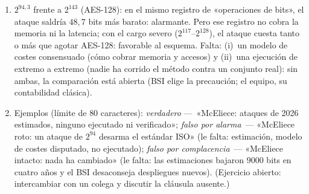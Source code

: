 \begin{enumerate}[leftmargin=1.9em,itemsep=4pt]
        cifra concreta $2^{102{,}4}$ depende de la contabilidad.
        (c)~Heurística y disputada: la afirmación de Vedenev
        «esencialmente una ejecución» no está verificada de forma
        independiente (hay réplicas y contra-réplicas). (d)~Hecho
        (negativo y verificable): nadie ha ejecutado el cómputo de
        núcleos contra un conjunto real; los retos TII tienen
        $n=214$.
  \item $2^{94{,}3}$ frente a $2^{143}$ (AES-128): en el mismo
        registro de «operaciones de bits», el ataque saldría
        $48{,}7$ bits más barato: alarmante. Pero ese registro no
        cobra la memoria ni la latencia; con el cargo severo
        ($2^{117}$--$2^{128}$), el ataque cuesta tanto o más que
        agotar AES-128: favorable al esquema. Falta: (i)~un modelo
        de costes consensuado (cómo cobrar memoria y accesos) y
        (ii)~una ejecución de extremo a extremo (nadie ha corrido
        el método contra un conjunto real): sin ambas, la
        comparación está abierta (BSI elige la precaución; el
        equipo, su contabilidad clásica).
  \item Ejemplos (límite de $80$ caracteres):
        \emph{verdadero} ---~«McEliece: ataques de 2026 estimados,
        ninguno ejecutado ni verificado»; \emph{falso por
        alarma}~--- «McEliece roto: un ataque de $2^{94}$ desarma
        el estándar ISO» (le falta: estimación, modelo de costes
        disputado, no ejecutado); \emph{falso por
        complacencia}~--- «McEliece intacto: nada ha cambiado»
        (le falta: las estimaciones bajaron $9000$ bits en cuatro
        años y el BSI desaconseja despliegues nuevos). (Ejercicio
        abierto: intercambiar con un colega y discutir la cláusula
        ausente.)
\end{enumerate}
